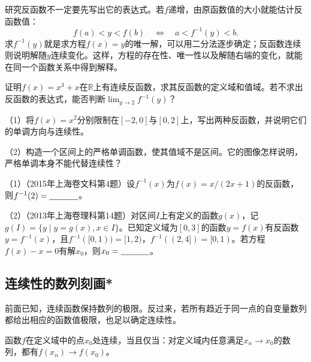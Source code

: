 研究反函数不一定要先写出它的表达式。若\(f\)递增，由原函数值的大小就能估计反函数值：
\begin{equation*}
 f(a)<y<f(b)\quad\Longleftrightarrow\quad a<f^{-1}(y)<b.
\end{equation*}
求\(f^{-1}(y)\)就是求方程\(f(x)=y\)的唯一解，可以用二分法逐步确定；反函数连续则说明解随\(y\)连续变化。这样，方程的存在性、唯一性以及解随右端的变化，就能在同一个函数关系中得到解释。

\begin{example}
证明\(f(x)=x^3+x\)在\(\mathbb R\)上有连续反函数，求其反函数的定义域和值域。若不求出反函数的表达式，能否判断\(\lim_{y\to2}f^{-1}(y)\)？
\end{example}

\begin{exercise}
\mbox{}\par\nobreak

（1）将\(f(x)=x^2\)分别限制在\([-2,0]\)与\([0,2]\)上，写出两种反函数，并说明它们的单调方向与连续性。

（2）构造一个区间上的严格单调函数，使其值域不是区间。它的图像怎样说明，严格单调本身不能代替连续性？

\end{exercise}

\begin{exercise}
\mbox{}\par\nobreak

（1）（2015年上海卷文科第4题）设\(f^{-1}(x)\)为\(f(x)=x/(2x+1)\)的反函数，则\(f^{-1}(2)=\underline{\hspace{1.2cm}}\)。

（2）（2013年上海卷理科第14题）对区间\(I\)上有定义的函数\(g(x)\)，记\(g(I)=\{y\mid y=g(x),x\in I\}\)。已知定义域为\([0,3]\)的函数\(y=f(x)\)有反函数\(y=f^{-1}(x)\)，且\(f^{-1}([0,1))=[1,2)\)，\(f^{-1}((2,4])=[0,1)\)。若方程\(f(x)-x=0\)有解\(x_0\)，则\(x_0=\underline{\hspace{1.2cm}}\)。
\end{exercise}

\endgroup
\newpage
\subsection{连续性的数列刻画*}
\label{subsec:functions-sequential-continuity}

前面已知，连续函数保持数列的极限。反过来，若所有趋近于同一点的自变量数列都给出相应的函数值极限，也足以确定连续性。

\begin{theorem}\label{thm:functions-sequential-continuity}
函数\(f\)在定义域中的点\(x_0\)处连续，当且仅当：对定义域内任意满足\(x_n\to x_0\)的数列，都有\(f(x_n)\to f(x_0)\)。
\end{theorem}

